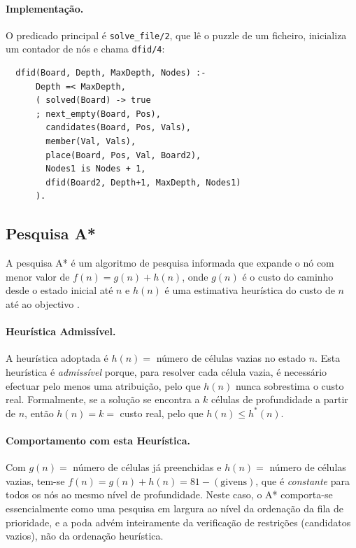\paragraph{Implementação.}
O predicado principal é \texttt{solve\_file/2}, que lê o puzzle de um ficheiro, inicializa um contador de nós e chama \texttt{dfid/4}:
\begin{verbatim}
  dfid(Board, Depth, MaxDepth, Nodes) :-
      Depth =< MaxDepth,
      ( solved(Board) -> true
      ; next_empty(Board, Pos),
        candidates(Board, Pos, Vals),
        member(Val, Vals),
        place(Board, Pos, Val, Board2),
        Nodes1 is Nodes + 1,
        dfid(Board2, Depth+1, MaxDepth, Nodes1)
      ).
\end{verbatim}

\subsection{Pesquisa A*}
\label{ssec:astar}

A pesquisa A* é um algoritmo de pesquisa informada que expande o nó com menor valor de $f(n) = g(n) + h(n)$, onde $g(n)$ é o custo do caminho desde o estado inicial até $n$ e $h(n)$ é uma estimativa heurística do custo de $n$ até ao objectivo \cite{russell2020ai}.

\paragraph{Heurística Admissível.}
A heurística adoptada é $h(n) = $ número de células vazias no estado $n$. Esta heurística é \emph{admissível} porque, para resolver cada célula vazia, é necessário efectuar pelo menos uma atribuição, pelo que $h(n)$ nunca sobrestima o custo real. Formalmente, se a solução se encontra a $k$ células de profundidade a partir de $n$, então $h(n) = k = $ custo real, pelo que $h(n) \leq h^*(n)$.

\paragraph{Comportamento com esta Heurística.}
Com $g(n) = $ número de células já preenchidas e $h(n) = $ número de células vazias, tem-se $f(n) = g(n) + h(n) = 81 - (\text{givens})$, que é \emph{constante} para todos os nós ao mesmo nível de profundidade. Neste caso, o A* comporta-se essencialmente como uma pesquisa em largura ao nível da ordenação da fila de prioridade, e a poda advém inteiramente da verificação de restrições (candidatos vazios), não da ordenação heurística.

